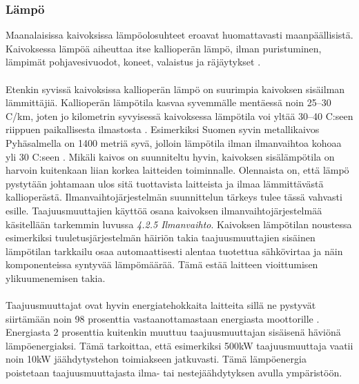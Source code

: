 \documentclass[finnish,12pt,a4paper,pdftex,elec,utf8]{aaltothesis}
\begin{document}
\subsubsection{Lämpö}
Maanalaisissa kaivoksissa lämpöolosuhteet eroavat huomattavasti maanpäällisistä. Kaivoksessa lämpöä aiheuttaa itse kallioperän lämpö, ilman puristuminen, lämpimät pohjavesivuodot, koneet, valaistus ja räjäytykset \cite[s. 305]{Hakapää}. 
\\\\
Etenkin syvissä kaivoksissa kallioperän lämpö on suurimpia kaivoksen sisäilman lämmittäjiä. Kallioperän lämpötila kasvaa syvemmälle mentäessä noin 25--30 \textdegree C/km, joten jo kilometrin syvyisessä kaivoksessa lämpötila voi yltää 30--40 \textdegree C:seen riippuen paikallisesta ilmastosta \cite[s. 62]{maanlampo}.
Esimerkiksi Suomen syvin metallikaivos Pyhäsalmella on 1400 metriä syvä, jolloin lämpötila ilman ilmanvaihtoa kohoaa yli 30 \textdegree C:seen \cite{Pyhäsalmi}. Mikäli kaivos on suunniteltu hyvin, kaivoksen sisälämpötila on harvoin kuitenkaan liian korkea laitteiden toiminnalle. Olennaista on, että lämpö pystytään johtamaan ulos sitä tuottavista laitteista ja ilmaa lämmittävästä kallioperästä. Ilmanvaihtojärjestelmän suunnittelun tärkeys tulee tässä vahvasti esille. Taajuusmuuttajien käyttöä osana kaivoksen ilmanvaihtojärjestelmää käsitellään tarkemmin luvussa \textit{4.2.5 Ilmanvaihto}. Kaivoksen lämpötilan noustessa esimerkiksi tuuletusjärjestelmän häiriön takia taajuusmuuttajien sisäinen lämpötilan tarkkailu osaa automaattisesti alentaa tuotettua sähkövirtaa ja näin komponenteissa syntyvää lämpömäärää. Tämä estää laitteen vioittumisen ylikuumenemisen takia.
\\\\
Taajuusmuuttajat ovat hyvin energiatehokkaita laitteita sillä ne pystyvät siirtämään noin 98 prosenttia vastaanottamastaan energiasta moottorille \cite{ABBinmining}. Energiasta 2 prosenttia kuitenkin muuttuu taajuusmuuttajan sisäisenä häviönä lämpöenergiaksi. Tämä tarkoittaa, että esimerkiksi 500kW taajuusmuuttaja vaatii noin 10kW jäähdytystehon toimiakseen jatkuvasti. Tämä lämpöenergia poistetaan taajuusmuuttajasta ilma- tai nestejäähdytyksen avulla ympäristöön.
 
\end{document}
